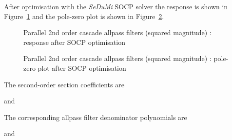 \documentclass[a4paper,twoside,10pt,english]{report}
\begin{document}
After optimisation with the \emph{SeDuMi} SOCP solver the response is shown in
Figure~\ref{fig:Parallel-2nd-order-cascade-allpass-sqmag-SOCP-response} and
the pole-zero plot is shown in
Figure~\ref{fig:Parallel-2nd-order-cascade-allpass-sqmag-SOCP-pz}.
\begin{figure}[!htbp]
\begin{center}
\scalebox{0.7}{}
\caption{Parallel 2nd order cascade allpass filters (squared magnitude) : response after SOCP optimisation}
\label{fig:Parallel-2nd-order-cascade-allpass-sqmag-SOCP-response}
\end{center}
\end{figure}
\begin{figure}[!htbp]
\begin{center}
\scalebox{0.7}{}
\caption{Parallel 2nd order cascade allpass filters (squared magnitude) : pole-zero plot after SOCP optimisation}
\label{fig:Parallel-2nd-order-cascade-allpass-sqmag-SOCP-pz}
\end{center}
\end{figure}
The second-order section coefficients are
\begin{small}

\end{small}
and
\begin{small}

\end{small}
The corresponding allpass filter denominator polynomials are
\begin{small}

\end{small}
and
\begin{small}

\end{small}
\end{document}
